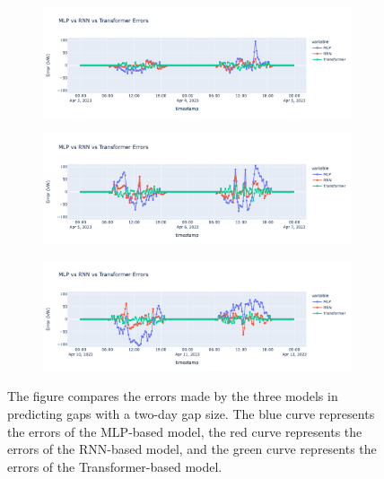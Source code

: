 \begin{figure}[]
	\centering
	\begin{subfigure}{\textwidth}
		\centering
		\includegraphics[width=\textwidth]{chapters/4_evaluation/imgs/cmp1.png}
		\caption{}
	\end{subfigure}
	\begin{subfigure}{\textwidth}
		\centering
		\includegraphics[width=\textwidth]{chapters/4_evaluation/imgs/cmp3.png}
		\caption{}
	\end{subfigure}
	\begin{subfigure}{\textwidth}
		\centering
		\includegraphics[width=\textwidth]{chapters/4_evaluation/imgs/cmp4.png}
		\caption{}
	\end{subfigure}
	\caption{The figure compares the errors made by the three models in predicting gaps with a two-day gap size. The blue curve represents the errors of the MLP-based model, the red curve represents the errors of the RNN-based model, and the green curve represents the errors of the Transformer-based model.}

\end{figure}
